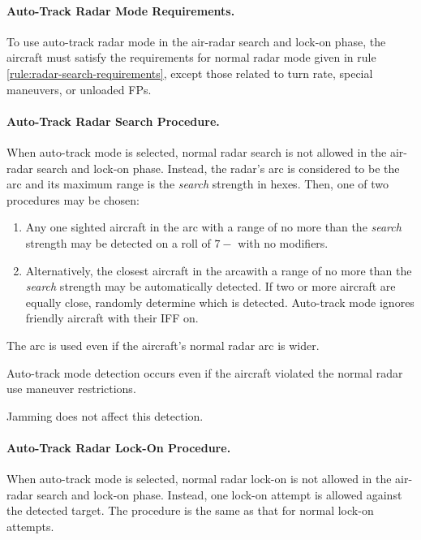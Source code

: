 \begin{advancedrules}
{\paragraph{Auto-Track Radar Mode Requirements.} To use auto-track radar mode in the air-radar search and lock-on phase, the aircraft must satisfy the requirements for normal radar mode given in rule \ref{rule:radar-search-requirements}, except those related to turn rate, special maneuvers, or unloaded FPs.

\paragraph{Auto-Track Radar Search Procedure.} When auto-track mode is selected, normal radar search is not allowed in the air-radar search and lock-on phase. Instead, the radar's arc is considered to be the \emph{} arc and its maximum range is the \emph{search} strength in hexes. Then, one of two procedures may be chosen:
\begin{enumerate}
\item Any one sighted aircraft in the \emph{} arc with a range of no more than the \emph{search} strength may be detected on a roll of $7-$ with no modifiers.
\item Alternatively, the closest aircraft in the \emph{} arcawith a range of no more than the \emph{search} strength may be automatically detected. If two or more aircraft are equally close, randomly determine which is detected. Auto-track mode ignores friendly aircraft with their IFF on.
\end{enumerate}

The  arc is used even if the aircraft's normal radar arc is wider.

Auto-track mode detection occurs even if the aircraft violated the normal radar use maneuver restrictions.

Jamming does not affect this detection. 


\paragraph{Auto-Track Radar Lock-On Procedure.} 
When auto-track mode is selected, normal radar lock-on is not allowed in the air-radar search and lock-on phase.
Instead, one lock-on attempt is allowed against the detected target. The procedure is the same as that for normal lock-on attempts.


}
\end{advancedrules}
